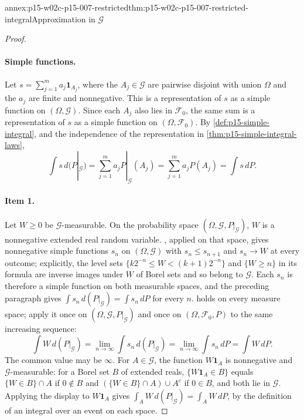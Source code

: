 \begin{annexitem}{annex:p15-w02c-p15-007-restricted}{thm:p15-w02c-p15-007-restricted-integral}{Approximation in \(\mathcal G\)}
\begin{proof}
\paragraph{Simple functions.}
Let \(s=\sum_{j=1}^m a_j\mathbf1_{A_j}\), where the \(A_j\in\mathcal G\)
are pairwise disjoint with union \(\Omega\) and the \(a_j\) are finite and
nonnegative. This is a representation of \(s\) as a simple function on
\((\Omega,\mathcal G)\). Since each \(A_j\) also lies in \(\mathcal F_0\),
the same sum is a representation of \(s\) as a simple function on
\((\Omega,\mathcal F_0)\). By \cref{def:p15-simple-integral}, and the
independence of the representation in
\cref{thm:p15-simple-integral-laws},
\[
 \int s\,d(P|_{\mathcal G})
   =\sum_{j=1}^m a_jP|_{\mathcal G}(A_j)
   =\sum_{j=1}^m a_jP(A_j)
   =\int s\,dP .
\]

\paragraph{Item 1.}
Let \(W\geq0\) be \(\mathcal G\)-measurable. On the probability space
\((\Omega,\mathcal G,P|_{\mathcal G})\), \(W\) is a nonnegative extended
real random variable. , applied on that
space, gives nonnegative simple functions \(s_n\) on
\((\Omega,\mathcal G)\) with \(s_n\leq s_{n+1}\) and \(s_n\to W\) at every
outcome; explicitly, the level sets
\(\{k2^{-n}\leq W<(k+1)2^{-n}\}\) and \(\{W\geq n\}\) in its formula are
inverse images under \(W\) of Borel sets and so belong to \(\mathcal G\).
Each \(s_n\) is therefore a simple function on both measurable spaces, and
the preceding paragraph gives
\(\int s_n\,d(P|_{\mathcal G})=\int s_n\,dP\) for every \(n\).
 holds on every measure space; apply it
once on \((\Omega,\mathcal G,P|_{\mathcal G})\) and once on
\((\Omega,\mathcal F_0,P)\) to the same increasing sequence:
\[
 \int W\,d(P|_{\mathcal G})
   =\lim_{n\to\infty}\int s_n\,d(P|_{\mathcal G})
   =\lim_{n\to\infty}\int s_n\,dP
   =\int W\,dP .
\]
The common value may be \(\infty\). For \(A\in\mathcal G\), the function
\(W\mathbf1_A\) is nonnegative and \(\mathcal G\)-measurable: for a Borel
set \(B\) of extended reals, \(\{W\mathbf1_A\in B\}\) equals
\(\{W\in B\}\cap A\) if \(0\notin B\) and
\((\{W\in B\}\cap A)\cup A^c\) if \(0\in B\), and both lie in
\(\mathcal G\). Applying the display to \(W\mathbf1_A\) gives
\(\int_AW\,d(P|_{\mathcal G})=\int_AW\,dP\), by the definition of an
integral over an event on each space.


\end{proof}
\end{annexitem}
